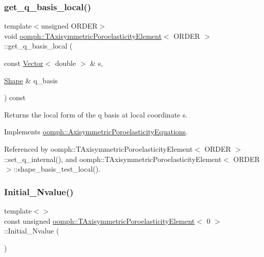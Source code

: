 \subsubsection{\texorpdfstring{get\+\_\+q\+\_\+basis\+\_\+local()}{get\_q\_basis\_local()}\hspace{0.1cm}{\footnotesize\ttfamily [3/3]}}
{\footnotesize\ttfamily template$<$unsigned O\+R\+D\+ER$>$ \\
void \hyperlink{classoomph_1_1TAxisymmetricPoroelasticityElement}{oomph\+::\+T\+Axisymmetric\+Poroelasticity\+Element}$<$ O\+R\+D\+ER $>$\+::get\+\_\+q\+\_\+basis\+\_\+local (\begin{DoxyParamCaption}\item[{const \hyperlink{classoomph_1_1Vector}{Vector}$<$ double $>$ \&}]{s,  }\item[{\hyperlink{classoomph_1_1Shape}{Shape} \&}]{q\+\_\+basis }\end{DoxyParamCaption}) const\hspace{0.3cm}{\ttfamily [virtual]}}



Returns the local form of the q basis at local coordinate s. 



Implements \hyperlink{classoomph_1_1AxisymmetricPoroelasticityEquations_afe94aaa6d3af8c997c760465b6930c27}{oomph\+::\+Axisymmetric\+Poroelasticity\+Equations}.



Referenced by oomph\+::\+T\+Axisymmetric\+Poroelasticity\+Element$<$ O\+R\+D\+E\+R $>$\+::set\+\_\+q\+\_\+internal(), and oomph\+::\+T\+Axisymmetric\+Poroelasticity\+Element$<$ O\+R\+D\+E\+R $>$\+::shape\+\_\+basis\+\_\+test\+\_\+local().

\mbox{\label{classoomph_1_1TAxisymmetricPoroelasticityElement_aaa52c5f73e3c65cc4ade9b51cd55f021}} 
\subsubsection{\texorpdfstring{Initial\+\_\+\+Nvalue()}{Initial\_Nvalue()}\hspace{0.1cm}{\footnotesize\ttfamily [1/2]}}
{\footnotesize\ttfamily template$<$$>$ \\
const unsigned \hyperlink{classoomph_1_1TAxisymmetricPoroelasticityElement}{oomph\+::\+T\+Axisymmetric\+Poroelasticity\+Element}$<$ 0 $>$\+::Initial\+\_\+\+Nvalue (\begin{DoxyParamCaption}{ }\end{DoxyParamCaption})\hspace{0.3cm}{\ttfamily [private]}}



